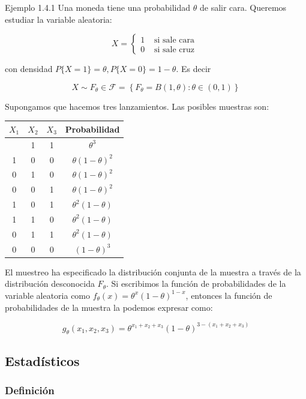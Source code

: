 \documentclass[
]{article}
\begin{document}
Ejemplo 1.4.1 Una moneda tiene una probabilidad \(\theta\) de salir cara. Queremos estudiar la variable aleatoria:

\[
X= \begin{cases}1 & \text { si sale cara } \\ 0 & \text { si sale cruz }\end{cases}
\]

con densidad \(P\{X=1\}=\theta, P\{X=0\}=1-\theta\). Es decir

\[
X \sim F_{\theta} \in \mathcal{F}=\left\{F_{\theta}=B(1, \theta): \theta \in(0,1)\right\}
\]

Supongamos que hacemos tres lanzamientos. Las posibles muestras son:

\begin{longtable}[]{@{}cccc@{}}
\toprule\noalign{}
\(X_{1}\) & \(X_{2}\) & \(X_{3}\) & Probabilidad \\
\midrule\noalign{}
\endhead
\bottomrule\noalign{}
\endlastfoot
1 & 1 & 1 & \(\theta^{3}\) \\
1 & 0 & 0 & \(\theta(1-\theta)^{2}\) \\
0 & 1 & 0 & \(\theta(1-\theta)^{2}\) \\
0 & 0 & 1 & \(\theta(1-\theta)^{2}\) \\
1 & 0 & 1 & \(\theta^{2}(1-\theta)\) \\
1 & 1 & 0 & \(\theta^{2}(1-\theta)\) \\
0 & 1 & 1 & \(\theta^{2}(1-\theta)\) \\
0 & 0 & 0 & \((1-\theta)^{3}\) \\
\end{longtable}

El muestreo ha especificado la distribución conjunta de la muestra a través de la distribución desconocida \(F_{\theta}\). Si escribimos la función de probabilidades de la variable aleatoria como \(f_{\theta}(x)=\theta^{x}(1-\theta)^{1-x}\), entonces la función de probabilidades de la muestra la podemos expresar como:

\[
g_{\theta}\left(x_{1}, x_{2}, x_{3}\right)=\theta^{x_{1}+x_{2}+x_{3}}(1-\theta)^{3-\left(x_{1}+x_{2}+x_{3}\right)}
\]

\subsection{Estadísticos}\label{estaduxedsticos}

\subsubsection{Definición}\label{definiciuxf3n-1}
\end{document}
